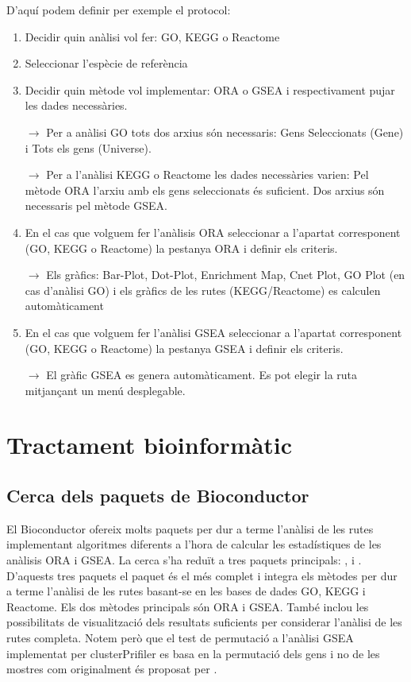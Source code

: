 D'aquí podem definir per exemple el protocol:
\begin{enumerate}
\item Decidir quin anàlisi vol fer: \gls{GO}, \gls{KEGG} o Reactome
\item Seleccionar l'espècie de referència
\item Decidir quin mètode vol implementar: \gls{ORA} o \gls{GSEA} i respectivament pujar les dades necessàries.

$\rightarrow$ Per a anàlisi \gls{GO} tots dos arxius són necessaris: Gens Seleccionats (Gene) i Tots els gens (Universe). 

$\rightarrow$ Per a l'anàlisi \gls{KEGG} o Reactome les dades necessàries varien: Pel mètode \gls{ORA} l'arxiu amb els gens seleccionats és suficient. Dos arxius són necessaris pel mètode \gls{GSEA}.
\item En el cas que volguem fer l'anàlisis \gls{ORA} seleccionar a l'apartat corresponent (\gls{GO}, \gls{KEGG} o Reactome) la pestanya \gls{ORA} i definir els criteris.

$\rightarrow$ Els gràfics: \gls{Bar-Plot}, \gls{Dot-Plot}, \gls{Enrichment Map}, Cnet Plot, GO Plot (en cas d'anàlisi \gls{GO}) i els gràfics de les rutes (\gls{KEGG}/Reactome) es calculen automàticament

\item En el cas que volguem fer l'anàlisi \gls{GSEA} seleccionar a l'apartat corresponent (\gls{GO}, \gls{KEGG} o Reactome) la pestanya \gls{GSEA} i definir els criteris.

$\rightarrow$ El gràfic GSEA es genera automàticament. Es pot elegir la ruta mitjançant un menú desplegable.

\end{enumerate}

\chapter{Tractament bioinformàtic}

\section{Cerca dels paquets de \gls{Bioconductor}}
El \gls{Bioconductor} ofereix molts paquets per dur a terme l'anàlisi de les rutes implementant algoritmes diferents a l'hora de calcular les estadístiques de les anàlisis \gls{ORA} i \gls{GSEA}. La cerca s'ha reduït a tres paquets principals: ,  i . D'aquests tres paquets el paquet  és el més complet i integra els mètodes per dur a terme l'anàlisi de les rutes basant-se en les bases de dades \gls{GO}, \gls{KEGG} i Reactome. Els dos mètodes principals són \gls{ORA} i \gls{GSEA}. També inclou les possibilitats de visualització dels resultats suficients per considerar l'anàlisi de les rutes completa. Notem però que el test de permutació a l'anàlisi \gls{GSEA} implementat per clusterPrifiler es basa en la permutació dels gens i no de les mostres com originalment és proposat per \cite{subramanian2005gene}.

